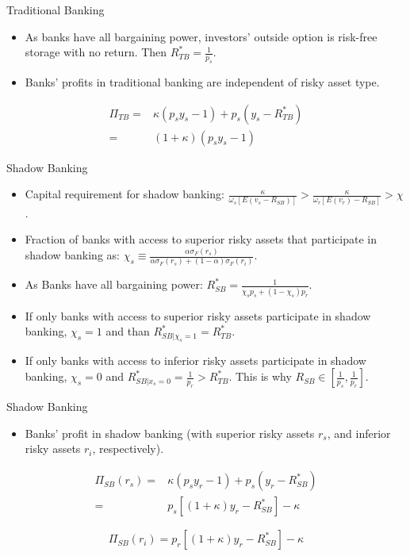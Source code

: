 \documentclass[
  ignorenonframetext,
]{beamer}
\providecommand{\tightlist}{%
  \setlength{\itemsep}{0pt}\setlength{\parskip}{0pt}}
\begin{document}
\begin{frame}{Traditional Banking}
\protect\hypertarget{traditional-banking-1}{}

\begin{itemize}
\item
  As banks have all bargaining power, investors' outside option is
  risk-free storage with no return. Then \(R^*_{TB}=\frac{1}{p_{s}}\).
\item
  Banks' profits in traditional banking are independent of risky asset
  type.
\end{itemize}

\[
\begin{align*}
\Pi_{TB}=&\kappa(p_{s}y_{s}-1)+p_{s}(y_{s}-R^*_{TB})\\
=&(1+\kappa)(p_{s}y_{s}-1)
\end{align*}
\]

\end{frame}

\begin{frame}{Shadow Banking}
\protect\hypertarget{shadow-banking}{}

\begin{itemize}
\item
  Capital requirement for shadow banking:
  \(\frac{\kappa}{\omega_{s}[E(v_{s}-R_{SB})]}>\frac{\kappa}{\omega_{r}[E(v_{r})-R_{SB}]}>\chi\).
\item
  Fraction of banks with access to superior risky assets that
  participate in shadow banking as:
  \(\chi_{s}\equiv\frac{\alpha\sigma_{F}(r_{s})}{\alpha\sigma_{F}(r_{s})+(1-\alpha)\sigma_{F}(r_{i})}\).
\item
  As Banks have all bargaining power:
  \(R^*_{SB}=\frac{1}{\chi_{s}p_{s}+(1-\chi_{s})p_{r}}\).
\item
  If only banks with access to superior risky assets participate in
  shadow banking, \(\chi_{s}=1\) and than
  \(R^*_{SB|\chi_{s}=1}=R^*_{TB}\).
\item
  If only banks with access to inferior risky assets participate in
  shadow banking, \(\chi_{s}=0\) and
  \(R^*_{SB|x_{s}=0}=\frac{1}{p_{r}}>R^*_{TB}\). This is why
  \(R_{SB}\in[\frac{1}{p_{s}}, \frac{1}{p_{r}}]\).
\end{itemize}

\end{frame}

\begin{frame}{Shadow Banking}
\protect\hypertarget{shadow-banking-1}{}

\begin{itemize}
\tightlist
\item
  Banks' profit in shadow banking (with superior risky assets \(r_{s}\),
  and inferior risky assets \(r_{i}\), respectively).
\end{itemize}

\[
\begin{align*}
\Pi_{SB}(r_{s})=&\kappa(p_{s}y_{r}-1)+p_{s}(y_{r}-R^*_{SB})\\
=&p_{s}[(1+\kappa)y_{r}-R^*_{SB}]-\kappa
\end{align*}
\]

\[
\Pi_{SB}(r_{i})=p_{r}[(1+\kappa)y_{r}-R^*_{SB}]-\kappa
\]

\end{frame}
\end{document}
